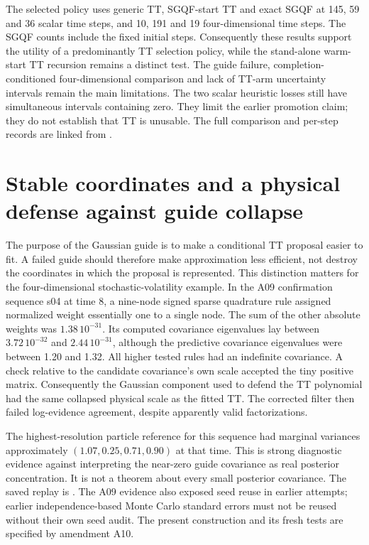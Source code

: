 \documentclass[11pt]{article}
\begin{document}
The selected policy uses generic TT, SGQF-start TT and exact SGQF at
145, 59 and 36 scalar time steps, and 10, 191 and 19 four-dimensional time
steps. The SGQF counts include the fixed initial steps. Consequently these
results support the utility of a predominantly TT selection policy, while
the stand-alone warm-start TT recursion remains a distinct test. The guide
failure, completion-conditioned four-dimensional comparison and lack of
TT-arm uncertainty intervals remain the main limitations. The two scalar
heuristic losses still have simultaneous intervals containing zero. They
limit the earlier promotion claim; they do not establish that TT is unusable.
The full comparison and per-step records are linked from
.

\section{Stable coordinates and a physical defense against guide collapse}
\label{sec:robust-guide}

The purpose of the Gaussian guide is to make a conditional TT proposal easier
to fit. A failed guide should therefore make approximation less efficient,
not destroy the coordinates in which the proposal is represented. This
distinction matters for the four-dimensional stochastic-volatility example.
In the A09 confirmation sequence s04 at time 8, a nine-node signed sparse
quadrature rule assigned normalized weight essentially one to a single node.
The sum of the other absolute weights was $1.38\,10^{-31}$. Its computed
covariance eigenvalues lay between $3.72\,10^{-32}$ and $2.44\,10^{-31}$,
although the predictive covariance eigenvalues were between 1.20 and 1.32.
All higher tested rules had an indefinite covariance. A check relative to
the candidate covariance's own scale accepted the tiny positive matrix.
Consequently the Gaussian component used to defend the TT polynomial had
the same collapsed physical scale as the fitted TT. The corrected filter
then failed log-evidence agreement, despite apparently valid factorizations.

The highest-resolution particle reference for this sequence had marginal
variances approximately $(1.07,0.25,0.71,0.90)$ at that time. This is strong
diagnostic evidence against interpreting the near-zero guide covariance as
real posterior concentration. It is not a theorem about every small
posterior covariance. The saved replay is
.
The A09 evidence also exposed seed reuse in earlier attempts; earlier
independence-based Monte Carlo standard errors must not be reused without
their own seed audit. The present construction and its fresh tests are
specified by amendment A10.
\end{document}

